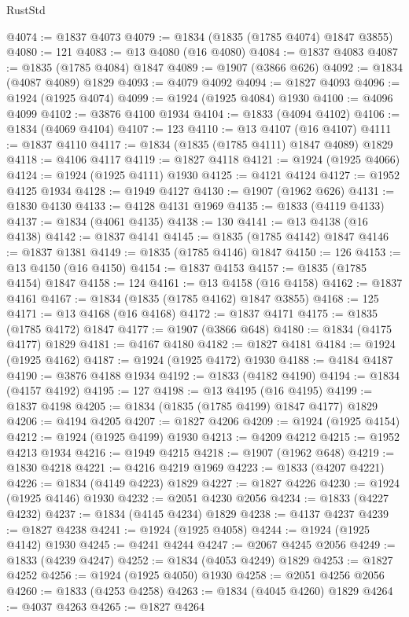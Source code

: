 \begin{lexlean}{RustStd}
\begin{coremodule}
@4074 := @1837 @4073
@4079 := @1834 (@1835 (@1785 @4074) @1847 @3855)
@4080 := 121
@4083 := @13 @4080 (@16 @4080)
@4084 := @1837 @4083
@4087 := @1835 (@1785 @4084) @1847
@4089 := @1907 (@3866 @626)
@4092 := @1834 (@4087 @4089) @1829
@4093 := @4079 @4092
@4094 := @1827 @4093
@4096 := @1924 (@1925 @4074)
@4099 := @1924 (@1925 @4084) @1930
@4100 := @4096 @4099
@4102 := @3876 @4100 @1934
@4104 := @1833 (@4094 @4102)
@4106 := @1834 (@4069 @4104)
@4107 := 123
@4110 := @13 @4107 (@16 @4107)
@4111 := @1837 @4110
@4117 := @1834 (@1835 (@1785 @4111) @1847 @4089) @1829
@4118 := @4106 @4117
@4119 := @1827 @4118
@4121 := @1924 (@1925 @4066)
@4124 := @1924 (@1925 @4111) @1930
@4125 := @4121 @4124
@4127 := @1952 @4125 @1934
@4128 := @1949 @4127
@4130 := @1907 (@1962 @626)
@4131 := @1830 @4130
@4133 := @4128 @4131 @1969
@4135 := @1833 (@4119 @4133)
@4137 := @1834 (@4061 @4135)
@4138 := 130
@4141 := @13 @4138 (@16 @4138)
@4142 := @1837 @4141
@4145 := @1835 (@1785 @4142) @1847
@4146 := @1837 @1381
@4149 := @1835 (@1785 @4146) @1847
@4150 := 126
@4153 := @13 @4150 (@16 @4150)
@4154 := @1837 @4153
@4157 := @1835 (@1785 @4154) @1847
@4158 := 124
@4161 := @13 @4158 (@16 @4158)
@4162 := @1837 @4161
@4167 := @1834 (@1835 (@1785 @4162) @1847 @3855)
@4168 := 125
@4171 := @13 @4168 (@16 @4168)
@4172 := @1837 @4171
@4175 := @1835 (@1785 @4172) @1847
@4177 := @1907 (@3866 @648)
@4180 := @1834 (@4175 @4177) @1829
@4181 := @4167 @4180
@4182 := @1827 @4181
@4184 := @1924 (@1925 @4162)
@4187 := @1924 (@1925 @4172) @1930
@4188 := @4184 @4187
@4190 := @3876 @4188 @1934
@4192 := @1833 (@4182 @4190)
@4194 := @1834 (@4157 @4192)
@4195 := 127
@4198 := @13 @4195 (@16 @4195)
@4199 := @1837 @4198
@4205 := @1834 (@1835 (@1785 @4199) @1847 @4177) @1829
@4206 := @4194 @4205
@4207 := @1827 @4206
@4209 := @1924 (@1925 @4154)
@4212 := @1924 (@1925 @4199) @1930
@4213 := @4209 @4212
@4215 := @1952 @4213 @1934
@4216 := @1949 @4215
@4218 := @1907 (@1962 @648)
@4219 := @1830 @4218
@4221 := @4216 @4219 @1969
@4223 := @1833 (@4207 @4221)
@4226 := @1834 (@4149 @4223) @1829
@4227 := @1827 @4226
@4230 := @1924 (@1925 @4146) @1930
@4232 := @2051 @4230 @2056
@4234 := @1833 (@4227 @4232)
@4237 := @1834 (@4145 @4234) @1829
@4238 := @4137 @4237
@4239 := @1827 @4238
@4241 := @1924 (@1925 @4058)
@4244 := @1924 (@1925 @4142) @1930
@4245 := @4241 @4244
@4247 := @2067 @4245 @2056
@4249 := @1833 (@4239 @4247)
@4252 := @1834 (@4053 @4249) @1829
@4253 := @1827 @4252
@4256 := @1924 (@1925 @4050) @1930
@4258 := @2051 @4256 @2056
@4260 := @1833 (@4253 @4258)
@4263 := @1834 (@4045 @4260) @1829
@4264 := @4037 @4263
@4265 := @1827 @4264

\end{coremodule}
\end{lexlean}
